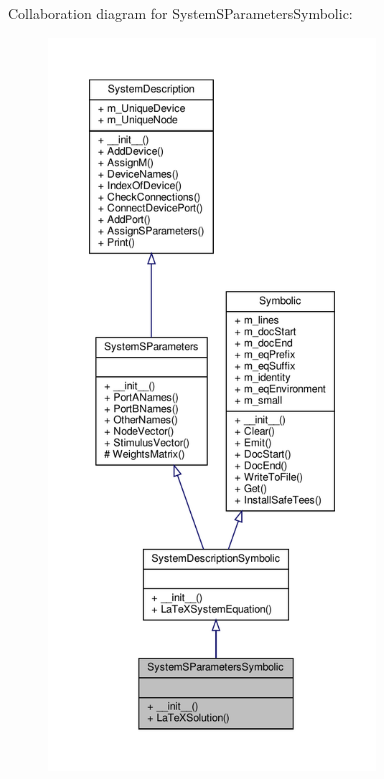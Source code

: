 Collaboration diagram for System\+S\+Parameters\+Symbolic\+:\nopagebreak
\begin{figure}[H]
\begin{center}
\leavevmode
\includegraphics[height=550pt]{classSignalIntegrity_1_1SystemDescriptions_1_1SystemSParametersSymbolic_1_1SystemSParametersSymbolic__coll__graph}
\end{center}
\end{figure}
